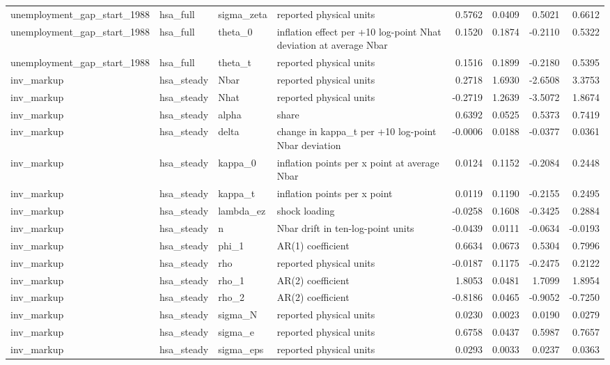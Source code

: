 \begin{tabular}{llllrrrr}
unemployment\_gap\_start\_1988 & hsa\_full & sigma\_zeta & reported physical units & 0.5762 & 0.0409 & 0.5021 & 0.6612 \\
unemployment\_gap\_start\_1988 & hsa\_full & theta\_0 & inflation effect per +10 log-point Nhat deviation at average Nbar & 0.1520 & 0.1874 & -0.2110 & 0.5322 \\
unemployment\_gap\_start\_1988 & hsa\_full & theta\_t & reported physical units & 0.1516 & 0.1899 & -0.2180 & 0.5395 \\
inv\_markup & hsa\_steady & Nbar & reported physical units & 0.2718 & 1.6930 & -2.6508 & 3.3753 \\
inv\_markup & hsa\_steady & Nhat & reported physical units & -0.2719 & 1.2639 & -3.5072 & 1.8674 \\
inv\_markup & hsa\_steady & alpha & share & 0.6392 & 0.0525 & 0.5373 & 0.7419 \\
inv\_markup & hsa\_steady & delta & change in kappa\_t per +10 log-point Nbar deviation & -0.0006 & 0.0188 & -0.0377 & 0.0361 \\
inv\_markup & hsa\_steady & kappa\_0 & inflation points per x point at average Nbar & 0.0124 & 0.1152 & -0.2084 & 0.2448 \\
inv\_markup & hsa\_steady & kappa\_t & inflation points per x point & 0.0119 & 0.1190 & -0.2155 & 0.2495 \\
inv\_markup & hsa\_steady & lambda\_ez & shock loading & -0.0258 & 0.1608 & -0.3425 & 0.2884 \\
inv\_markup & hsa\_steady & n & Nbar drift in ten-log-point units & -0.0439 & 0.0111 & -0.0634 & -0.0193 \\
inv\_markup & hsa\_steady & phi\_1 & AR(1) coefficient & 0.6634 & 0.0673 & 0.5304 & 0.7996 \\
inv\_markup & hsa\_steady & rho & reported physical units & -0.0187 & 0.1175 & -0.2475 & 0.2122 \\
inv\_markup & hsa\_steady & rho\_1 & AR(2) coefficient & 1.8053 & 0.0481 & 1.7099 & 1.8954 \\
inv\_markup & hsa\_steady & rho\_2 & AR(2) coefficient & -0.8186 & 0.0465 & -0.9052 & -0.7250 \\
inv\_markup & hsa\_steady & sigma\_N & reported physical units & 0.0230 & 0.0023 & 0.0190 & 0.0279 \\
inv\_markup & hsa\_steady & sigma\_e & reported physical units & 0.6758 & 0.0437 & 0.5987 & 0.7657 \\
inv\_markup & hsa\_steady & sigma\_eps & reported physical units & 0.0293 & 0.0033 & 0.0237 & 0.0363 \\

\end{tabular}
